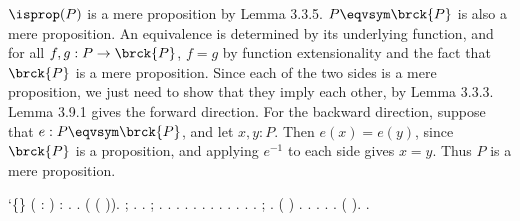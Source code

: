  \soln
$\isprop(P)$ is a mere proposition by Lemma 3.3.5.  $P \eqvsym \brck{P}$ is
also a mere proposition.  An equivalence is determined by its underlying
function, and for all $f, g : P \to \brck{P}$, $f = g$ by function
extensionality and the fact that $\brck{P}$ is a mere proposition.  Since each
of the two sides is a mere proposition, we just need to show that they imply
each other, by Lemma 3.3.3.  Lemma 3.9.1 gives the forward direction.  For the
backward direction, suppose that $e : P \eqvsym \brck{P}$, and let $x, y : P$.
Then $e(x) = e(y)$, since $\brck{P}$ is a proposition, and applying $e^{-1}$ to
each side gives $x = y$.  Thus $P$ is a mere proposition.
\begin{coqdoccode}
\coqdocemptyline
\coqdocnoindent
{}  `\{\} ( : ) :   \coqdocnotation{\ensuremath{\eqvsym}} \coqdocnotation{(} \coqdocnotation{\ensuremath{\eqvsym}}  \coqdocnotation{)}.\coqdoceol
\coqdocnoindent
{}.\coqdoceol
\coqdocindent{1.00em}
 ( ( \coqdocnotation{\ensuremath{\eqvsym}}  )).  ;   .\coqdoceol
\coqdocindent{1.00em}
 .  ;  .\coqdoceol
\coqdocindent{1.00em}
 .  .\coqdoceol
\coqdocindent{1.00em}
 .\coqdoceol
\coqdocemptyline
\coqdocindent{1.00em}
 .  .  .\coqdoceol
\coqdocindent{1.00em}
 .  .  .  .\coqdoceol
\coqdocemptyline
\coqdocindent{1.00em}
 .  ;   .\coqdoceol
\coqdocindent{1.00em}
 (  \coqdocnotation{=}  )  .  .  .\coqdoceol
\coqdocindent{1.00em}
 \coqdocnotation{(}  \coqdocnotation{)\^{}}.  \coqdocnotation{(}  \coqdocnotation{)\^{}}.\coqdoceol
\coqdocindent{1.00em}
 (  ).\coqdoceol
\coqdocnoindent
{}.\coqdoceol
\coqdocemptyline
\end{coqdoccode}
